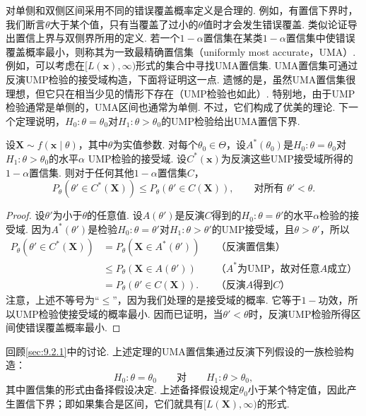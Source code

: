 对单侧和双侧区间采用不同的错误覆盖概率定义是合理的. 例如，有置信下界时，我们断言$\theta$大于某个值，只有当覆盖了过小的$\theta$值时才会发生错误覆盖. 类似论证导出置信上界与双侧界所用的定义.
若一个$1-\alpha$置信集在某类$1-\alpha$置信集中使错误覆盖概率最小，则称其为一致最精确置信集（uniformly most accurate，UMA）. 例如，可以考虑在$[L(\boldsymbol x),\infty)$形式的集合中寻找UMA置信集. UMA置信集可通过反演UMP检验的接受域构造，下面将证明这一点. 遗憾的是，虽然UMA置信集很理想，但它只在相当少见的情形下存在（UMP检验也如此）. 特别地，由于UMP检验通常是单侧的，UMA区间也通常为单侧. 不过，它们构成了优美的理论. 下一个定理说明，$H_0:\theta=\theta_0$对$H_1:\theta>\theta_0$的UMP检验给出UMA置信下界.
\begin{theorem}\label{thm:9.3.5}
设$\boldsymbol X\sim f(\boldsymbol x\mid\theta)$，其中$\theta$为实值参数. 对每个$\theta_0\in\Theta$，设$A^*(\theta_0)$是$H_0:\theta=\theta_0$对$H_1:\theta>\theta_0$的水平$\alpha$ UMP检验的接受域. 设$C^*(\boldsymbol x)$为反演这些UMP接受域所得的$1-\alpha$置信集. 则对于任何其他$1-\alpha$置信集$C$，
$$P_\theta(\theta'\in C^*(\boldsymbol X))\le P_\theta(\theta'\in C(\boldsymbol X)),\qquad\text{对所有 }\theta'<\theta.$$
\end{theorem}
\begin{proof}
设$\theta'$为小于$\theta$的任意值. 设$A(\theta')$是反演$C$得到的$H_0:\theta=\theta'$的水平$\alpha$检验的接受域. 因为$A^*(\theta')$是检验$H_0:\theta=\theta'$对$H_1:\theta>\theta'$的UMP接受域，且$\theta>\theta'$，所以
$$\begin{aligned}
P_\theta(\theta'\in C^*(\boldsymbol X))&=P_\theta(\boldsymbol X\in A^*(\theta'))&&\text{（反演置信集）}\\
&\le P_\theta(\boldsymbol X\in A(\theta'))&&\text{（$A^*$为UMP，故对任意$A$成立）}\\
&=P_\theta(\theta'\in C(\boldsymbol X)).&&\text{（反演$A$得到$C$）}
\end{aligned}$$
注意，上述不等号为“$\le$”，因为我们处理的是接受域的概率. 它等于$1-\text{功效}$，所以UMP检验使接受域的概率最小. 因而已证明，当$\theta'<\theta$时，反演UMP检验所得区间使错误覆盖概率最小.
\end{proof}
回顾\autoref{sec:9.2.1}中的讨论. 上述定理的UMA置信集通过反演下列假设的一族检验构造：
$$H_0:\theta=\theta_0\qquad\text{对}\qquad H_1:\theta>\theta_0,$$
其中置信集的形式由备择假设决定. 上述备择假设规定$\theta_0$小于某个特定值，因此产生置信下界；即如果集合是区间，它们就具有$[L(\boldsymbol X),\infty)$的形式.
